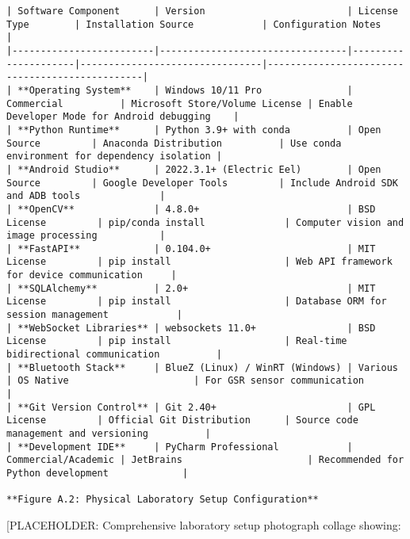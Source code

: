 \documentclass[12pt,a4paper]{report}
\begin{document}
\begin{verbatim}
| Software Component      | Version                         | License Type        | Installation Source            | Configuration Notes                            |
|-------------------------|---------------------------------|---------------------|--------------------------------|------------------------------------------------|
| **Operating System**    | Windows 10/11 Pro               | Commercial          | Microsoft Store/Volume License | Enable Developer Mode for Android debugging    |
| **Python Runtime**      | Python 3.9+ with conda          | Open Source         | Anaconda Distribution          | Use conda environment for dependency isolation |
| **Android Studio**      | 2022.3.1+ (Electric Eel)        | Open Source         | Google Developer Tools         | Include Android SDK and ADB tools              |
| **OpenCV**              | 4.8.0+                          | BSD License         | pip/conda install              | Computer vision and image processing           |
| **FastAPI**             | 0.104.0+                        | MIT License         | pip install                    | Web API framework for device communication     |
| **SQLAlchemy**          | 2.0+                            | MIT License         | pip install                    | Database ORM for session management            |
| **WebSocket Libraries** | websockets 11.0+                | BSD License         | pip install                    | Real-time bidirectional communication          |
| **Bluetooth Stack**     | BlueZ (Linux) / WinRT (Windows) | Various             | OS Native                      | For GSR sensor communication                   |
| **Git Version Control** | Git 2.40+                       | GPL License         | Official Git Distribution      | Source code management and versioning          |
| **Development IDE**     | PyCharm Professional            | Commercial/Academic | JetBrains                      | Recommended for Python development             |

**Figure A.2: Physical Laboratory Setup Configuration**

\end{verbatim}
[PLACEHOLDER: Comprehensive laboratory setup photograph collage showing:
\end{document}
